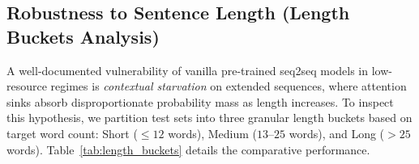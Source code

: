\documentclass[11pt,a4paper]{article}
\begin{document}
\subsection{Robustness to Sentence Length (Length Buckets Analysis)}
\label{sec:length_analysis}

A well-documented vulnerability of vanilla pre-trained seq2seq models in low-resource regimes is \textit{contextual starvation} on extended sequences, where attention sinks absorb disproportionate probability mass as length increases. To inspect this hypothesis, we partition test sets into three granular length buckets based on target word count: Short ($\le 12$ words), Medium ($13$--$25$ words), and Long ($> 25$ words). Table~\ref{tab:length_buckets} details the comparative performance.

\begin{table}[htbp]
\centering
\caption{\textbf{Fine-Grained Performance Breakdown across Sentence Length Buckets.} Evaluating the monotonic scaling of TSSA improvements as sentence length increases, mitigating contextual starvation and attention sinking.}
\label{tab:length_buckets}
\vspace{4pt}
\end{table}
\end{document}
